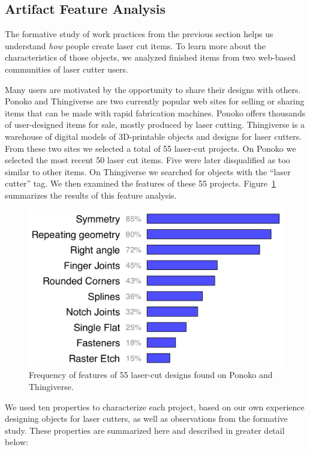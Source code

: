 \documentclass{article}
\begin{document}
\subsection{Artifact Feature Analysis}

The formative study of work practices from the previous section helps
us understand \textit{how} people create laser cut items. To learn
more about the characteristics of those objects, we analyzed finished
items from two web-based communities of laser cutter users.

Many users are motivated by the opportunity to share their designs
with others. Ponoko and Thingiverse are two currently popular web
sites for selling or sharing items that can be made with rapid
fabrication machines. Ponoko offers thousands of user-designed items
for sale, mostly produced by laser cutting. Thingiverse is a warehouse
of digital models of 3D-printable objects and designs for laser
cutters. From these two sites we selected a total of 55 laser-cut
projects. On Ponoko we selected the most recent 50 laser cut
items. Five were later disqualified as too similar to other items. On
Thingiverse we searched for objects with the ``laser cutter'' tag. We
then examined the features of these 55
projects. Figure~\ref{fig:ponoko} summarizes the results of this
feature analysis.

\begin{figure}[h]
  \centering
  \includegraphics[width=0.9\linewidth]{img/ponoko-graph.pdf}
  \caption{Frequency of features of 55 laser-cut designs found on
    Ponoko and Thingiverse.}
  \label{fig:ponoko}
\end{figure}

We used ten properties to characterize each project, based on our own
experience designing objects for laser cutters, as well as
observations from the formative study. These properties are summarized
here and described in greater detail below:
\end{document}
